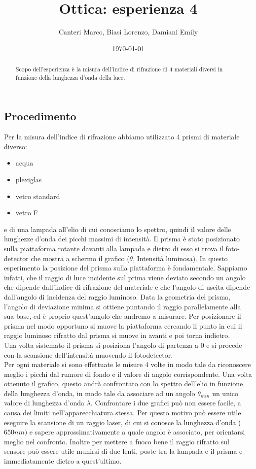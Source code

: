 \documentclass[letterpaper,11pt]{article}
\title{\textbf{Ottica:} esperienza 4}
\author{Canteri Marco, Biasi Lorenzo, Damiani Emily}
\date{\today}
\begin{document}
\maketitle

\begin{abstract}
\hspace{-1.9em}
Scopo dell'esperienza è la misura dell'indice di rifrazione di 4 materiali diversi in funzione della lunghezza d'onda della luce. 
\end{abstract}

\begin{body}
\section{Procedimento}
Per la misura dell'indice di rifrazione abbiamo utilizzato 4 prismi di materiale diverso: 
\begin{itemize}
\item acqua 
\item plexiglas
\item vetro standard
\item vetro F 
\end{itemize}
e di una lampada all'elio di cui conosciamo lo spettro, quindi il valore delle lunghezze d'onda dei picchi massimi di intensità. Il prisma è stato posizionato sulla piattaforma rotante davanti alla lampada e dietro di esso si trova il foto-detector che mostra a schermo il grafico ($\theta$, Intensità luminosa). In questo esperimento la posizione del prisma sulla piattaforma è fondamentale. Sappiamo infatti, che il raggio di luce incidente sul prima viene deviato secondo un angolo che dipende dall'indice di rifrazione del materiale e che l'angolo di uscita dipende dall'angolo di incidenza del raggio luminoso. Data la geometria del prisma, l'angolo di deviazione minima si ottiene puntando il raggio parallelamente alla sua base, ed è proprio quest'angolo che andremo a misurare. Per posizionare il prisma nel modo opportuno si  muove la piattaforma cercando il punto in cui il raggio luminoso rifratto dal prisma si muove in avanti e poi torna indietro. \\
Una volta sistemato il prisma si posiziona l'angolo di partenza a $0$ e si procede con la scansione dell'intensità muovendo il fotodetector. \\
Per ogni materiale si sono effettuate le misure 4 volte in modo tale da riconoscere meglio i picchi dal rumore di fondo e il valore di angolo corrispondente. Una volta ottenuto il grafico, questo andrà confrontato con lo spettro dell'elio in funzione della lunghezza d'onda, in modo tale da associare ad un angolo $\theta_{min}$ un unico valore di lunghezza d'onda $\lambda$. Confrontare i due grafici può non essere facile, a causa dei limiti nell'apparecchiatura stessa. Per questo motivo può essere utile eseguire la scansione di un raggio laser, di cui si conosce la lunghezza d'onda ($650 nm)$ e sapere approssimativamente a quale angolo è associato, per orientarsi meglio nel confronto. Inoltre per mettere a fuoco bene il raggio rifratto sul sensore può essere utile munirsi di due lenti, poste tra la lampada e il prisma e immediatamente dietro a quest'ultimo.\\

\end{body}
\end{document}
